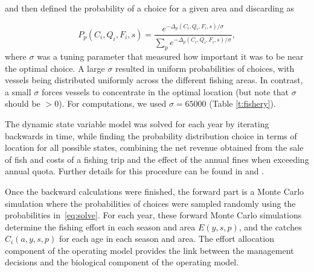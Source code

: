 \documentclass[12pt,oneline,a4paper,numbib]{ouparticle}
\numberwithin{equation}{subsection} %
\begin{document}
and then defined the probability of a choice for a given area and discarding as	

\begin{equation} \label{eq:solve}
P_{p}(C_i, Q_i, F_i, s) = \frac
                {e^{ -\Delta_{p}(C_i, Q_i, F_i, s)/\sigma}}
                {\sum_p e^{ -\Delta_{p}(C_i, Q_i, F_i, s)/\sigma}},
\end{equation}
where $\sigma$ was a tuning parameter that measured how important it was to be near the optimal choice. A large $\sigma$ resulted in uniform probabilities of choices, with vessels being distributed uniformly across the different fishing areas. In contrast, a small $\sigma$ forces vessels to concentrate in the optimal location (but note that $\sigma$ should be $> 0$). For computations, we used $\sigma = 65000$ (Table \ref{t:fishery}). %

The dynamic state variable model was solved for each year by iterating backwards in time, while finding the probability distribution choice in terms of location for all possible states, combining the net revenue obtained from the sale of fish and costs of a fishing trip and the effect of the annual fines when exceeding annual quota. Further details for this procedure can be found in \cite{Alzorriz2018, Batsleer2016} and \cite{Dowling2011}.

Once the backward calculations were finished, the forward part is a Monte Carlo simulation where the probabilities of choices were sampled randomly using the probabilities in~\ref{eq:solve}. For each year, these forward Monte Carlo simulations determine the fishing effort in each season and area $E(y,s,p)$, and the catches $C_i (a, y, s, p)$ for each age in each season and area. The effort allocation component of the operating model provides the link between the management decisions and the biological component of the operating model.
\end{document}
